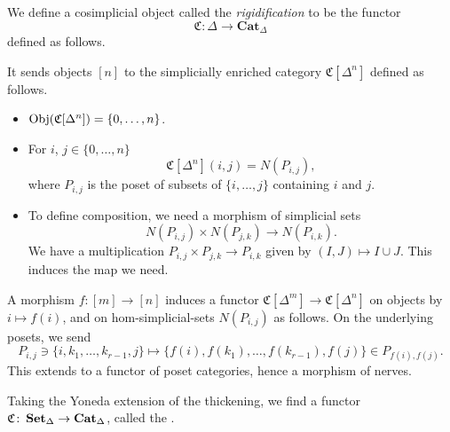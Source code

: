 \begin{definition}[Rigidification]
	\label{def:rigidification}
	We define a cosimplicial object called the \emph{rigidification} to be the functor
	\begin{equation*}
	\mathfrak{C}\colon \Delta \to \mathbf{Cat}_{\Delta}
	\end{equation*}
	defined as follows.
	
	It sends objects $[n]$ to the simplicially enriched category $\mathfrak{C}[\Delta^{n}]$ defined as follows.
	\begin{itemize}
		\item $\operatorname{Obj}(\mathfrak{C}[\Delta^{n}]) = \{0, \ldots, n\}$.
		
		\item For $i$, $j \in \{0, \ldots, n\}$
		\begin{equation*}
		\mathfrak{C}[\Delta^{n}](i, j) = N(P_{i, j}),
		\end{equation*}
		where $P_{i, j}$ is the poset of subsets of $\{i, \ldots, j\}$ containing $i$ and $j$.
		
		\item To define composition, we need a morphism of simplicial sets
		\begin{equation*}
		N(P_{i,j}) \times N(P_{j,k}) \to N(P_{i, k}).
		\end{equation*}
		We have a multiplication $P_{i,j} \times P_{j, k} \to P_{i, k}$ given by $(I, J) \mapsto I \cup J$. This induces the map we need.
	\end{itemize}
	
	A morphism $f\colon [m] \to [n]$ induces a functor $\mathfrak{C}[\Delta^{m}] \to \mathfrak{C}[\Delta^{n}]$ on objects by $i \mapsto f(i)$, and on hom-simplicial-sets $N(P_{i,j})$ as follows. On the underlying posets, we send
	\begin{equation*}
	P_{i,j} \ni \{ i, k_{1}, \ldots, k_{r-1}, j \} \mapsto \{f(i), f(k_{1}), \ldots, f(k_{r-1}), f(j)\} \in P_{f(i),f(j)}.
	\end{equation*}
	This extends to a functor of poset categories, hence a morphism of nerves.
	
	Taking the Yoneda extension of the thickening, we find a functor $\mathfrak{C}\colon \operatorname{\mathbf{Set}_{\Delta}} \to \operatorname{\mathbf{Cat}_{\Delta}}$, called the .
\end{definition}

